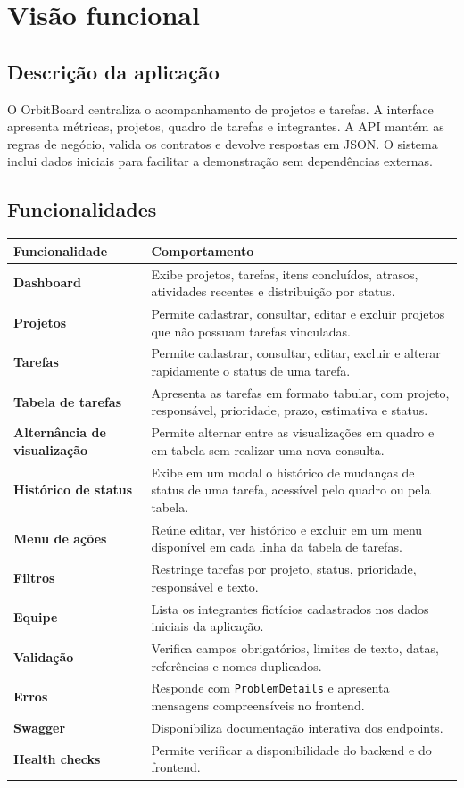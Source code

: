 \documentclass[12pt,a4paper,openany]{report}
\begin{document}
\chapter{Visão funcional}

\section{Descrição da aplicação}

O OrbitBoard centraliza o acompanhamento de projetos e tarefas. A interface apresenta métricas, projetos, quadro de tarefas e integrantes. A API mantém as regras de negócio, valida os contratos e devolve respostas em JSON. O sistema inclui dados iniciais para facilitar a demonstração sem dependências externas.

\section{Funcionalidades}

\begin{longtable}{>{\bfseries}p{} p{}}
\toprule
Funcionalidade & Comportamento \\
\midrule
\endhead
Dashboard & Exibe projetos, tarefas, itens concluídos, atrasos, atividades recentes e distribuição por status. \\
Projetos & Permite cadastrar, consultar, editar e excluir projetos que não possuam tarefas vinculadas. \\
Tarefas & Permite cadastrar, consultar, editar, excluir e alterar rapidamente o status de uma tarefa. \\
Tabela de tarefas & Apresenta as tarefas em formato tabular, com projeto, responsável, prioridade, prazo, estimativa e status. \\
Alternância de visualização & Permite alternar entre as visualizações em quadro e em tabela sem realizar uma nova consulta. \\
Histórico de status & Exibe em um modal o histórico de mudanças de status de uma tarefa, acessível pelo quadro ou pela tabela. \\
Menu de ações & Reúne editar, ver histórico e excluir em um menu disponível em cada linha da tabela de tarefas. \\
Filtros & Restringe tarefas por projeto, status, prioridade, responsável e texto. \\
Equipe & Lista os integrantes fictícios cadastrados nos dados iniciais da aplicação. \\
Validação & Verifica campos obrigatórios, limites de texto, datas, referências e nomes duplicados. \\
Erros & Responde com \texttt{ProblemDetails} e apresenta mensagens compreensíveis no frontend. \\
Swagger & Disponibiliza documentação interativa dos endpoints. \\
Health checks & Permite verificar a disponibilidade do backend e do frontend. \\
\bottomrule
\end{longtable}
\end{document}
